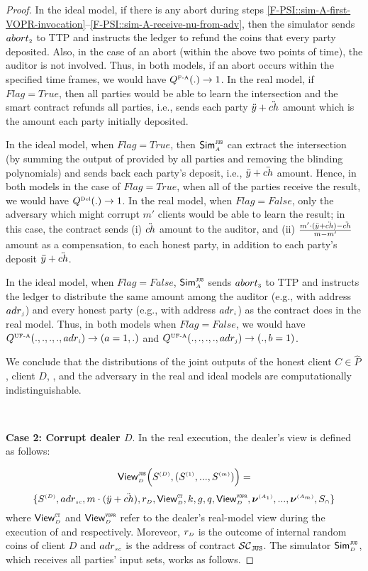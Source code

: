 \begin{proof}
In the ideal model, if there is any abort during steps \ref{F-PSI::sim-A-first-VOPR-invocation}--\ref{F-PSI::sim-A-receive-nu-from-adv}, then the simulator sends $abort_{\scriptscriptstyle 2}$ to TTP and instructs the ledger to refund the coins that every party deposited. Also, in the case of an abort (within the above two points of time), the auditor is not involved. Thus, in both models, if an abort occurs within the specified time frames, we would have $Q^{\scriptscriptstyle \text{F-A}}(.)\rightarrow1$. In the real model, if $Flag=True$, then all parties would be able to learn the intersection and the smart contract refunds all parties, i.e., sends each party $\ddot{y}+\ddot{ch}$ amount which is the amount each party initially deposited. 

In the ideal model, when $Flag=True$, then $\mathsf{Sim}^{\scriptscriptstyle \mathtt{JUS}}_{\scriptscriptstyle A}$ can extract the intersection (by summing the output of \vopr provided by all parties and removing the blinding polynomials) and sends back each party's deposit, i.e., $\ddot{y}+\ddot{ch}$ amount. Hence, in both models in the case of $Flag=True$, when all of the parties receive the result, we would have $Q^{\scriptscriptstyle \text{Del}}(.)\rightarrow 1$. In the real model, when $Flag=False$, only the adversary which might corrupt $m'$ clients would be able to learn the result; in this case, the contract sends (i) $\ddot{ch}$ amount to the auditor, and (ii) $\frac{m'\cdot (\ddot{y}+\ddot{ch})-\ddot{ch}}{m-m'}$ amount as a compensation, to each honest party, in addition to each party's deposit $\ddot{y}+\ddot{ch}$. 

In the ideal model,  when $Flag=False$, $\mathsf{Sim}^{\scriptscriptstyle \mathtt{JUS}}_{\scriptscriptstyle A}$  sends $abort_{\scriptscriptstyle 3}$ to TTP and instructs the ledger to distribute the same amount among the auditor (e.g., with address $adr_{\scriptscriptstyle j}$) and every honest party (e.g., with address $adr_{\scriptscriptstyle i}$) as the contract does in the real model. Thus, in both models when $Flag=False$, we would have $Q^{\scriptscriptstyle \text{UF-A}}(., ., ., ., adr_{\scriptscriptstyle i})\rightarrow (a=1, .)$ and  $Q^{\scriptscriptstyle \text{UF-A}}(., ., ., ., adr_{\scriptscriptstyle j})\rightarrow (., b=1)$. 

We conclude that the distributions of the joint outputs of the honest client $C\in \hat P$, client $D$, \aud, and the adversary in the real and ideal models are computationally indistinguishable.


\

\noindent\textbf{Case 2: Corrupt dealer $D$}.  In the real execution, the dealer's view is defined as follows: 


$$ \mathsf{View}_{\scriptscriptstyle D}^{\scriptscriptstyle \mathtt{JUS}} \Big(S^{\scriptscriptstyle (D)},(S^{\scriptscriptstyle (1)},..., S^{\scriptscriptstyle (m)})\Big)=$$ $$ \{S^{\scriptscriptstyle (D)}, adr_{\scriptscriptstyle sc}, m\cdot(\ddot{y}+\ddot{ch}), r_{\scriptscriptstyle D}, \mathsf{View}^{\scriptscriptstyle \mathtt{CT}}_{\scriptscriptstyle D}, k, g, q, \mathsf{View}^{\scriptscriptstyle \mathtt{VOPR}}_{\scriptscriptstyle D}, \bm\nu^{\scriptscriptstyle (A_1)},..., \bm\nu^{\scriptscriptstyle (A_m)}, S_{\scriptscriptstyle \cap}\}$$
%
where  $\mathsf{View}^{\scriptscriptstyle \mathtt{CT}}_{\scriptscriptstyle D}$ and $\mathsf{View}^{\scriptscriptstyle \mathtt{VOPR}}_{\scriptscriptstyle D}$ refer to the dealer's real-model view during the execution of \ct and \vopr respectively. Moreveor, $r_{\scriptscriptstyle D}$ is the outcome of internal random coins of client $D$ and $adr_{\scriptscriptstyle sc}$ is the address of contract $\mathcal{SC}_{\mathtt{JUS}}$. The simulator $\mathsf{Sim}^{\scriptscriptstyle \mathtt{JUS}}_{\scriptscriptstyle D}$, which receives all parties' input sets, works as follows. 


\end{proof}
